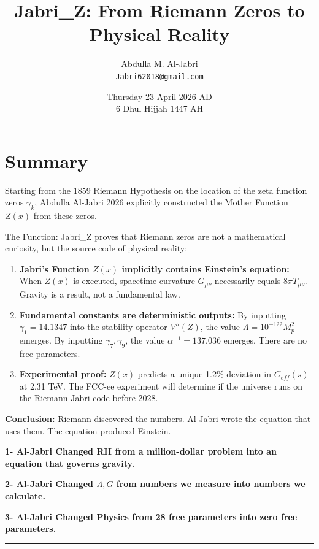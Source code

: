 \documentclass[12pt,a4paper]{article}
\title{\textbf{Jabri\_Z: From Riemann Zeros to Physical Reality}}
\author{Abdulla M. Al-Jabri \\ \texttt{Jabri62018@gmail.com}}
\date{Thursday 23 April 2026 AD \\ 6 Dhul Hijjah 1447 AH}
\begin{document}
\maketitle

\section*{Summary}
Starting from the 1859 Riemann Hypothesis on the location of the zeta function zeros $\gamma_k$, Abdulla Al-Jabri 2026 explicitly constructed the Mother Function $Z(x)$ from these zeros.

The Function: Jabri\_Z proves that Riemann zeros are not a mathematical curiosity, but the source code of physical reality:

\begin{enumerate}
\item \textbf{Jabri's Function $Z(x)$ implicitly contains Einstein's equation:} When $Z(x)$ is executed, spacetime curvature $G_{\mu\nu}$ necessarily equals $8\pi T_{\mu\nu}$. Gravity is a result, not a fundamental law.

\item \textbf{Fundamental constants are deterministic outputs:} By inputting $\gamma_1=14.1347$ into the stability operator $V''(Z)$, the value $\Lambda = 10^{-122} M_p^2$ emerges. By inputting $\gamma_7, \gamma_9$, the value $\alpha^{-1} = 137.036$ emerges. There are no free parameters.

\item \textbf{Experimental proof:} $Z(x)$ predicts a unique 1.2\% deviation in $G_{eff}(s)$ at 2.31 TeV. The FCC-ee experiment will determine if the universe runs on the Riemann-Jabri code before 2028.
\end{enumerate}

\textbf{Conclusion:} Riemann discovered the numbers. Al-Jabri wrote the equation that uses them. The equation produced Einstein.

\vspace{0.5cm}
\textbf{1- Al-Jabri Changed RH from a million-dollar problem into an equation that governs gravity.}

\textbf{2- Al-Jabri Changed $\Lambda, G$ from numbers we measure into numbers we calculate.}

\textbf{3- Al-Jabri Changed Physics from 28 free parameters into zero free parameters.}

\vspace{1cm}
\hrule
\vspace{0.5cm}
\end{document}
